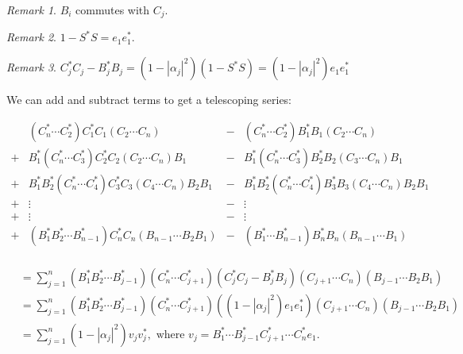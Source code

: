 \documentclass[twofold]{article}
\newcommand*\adj[1]{#1^*}
\newcommand*\abs[1]{\left \vert #1 \right\vert}
\theoremstyle{plain}
\theoremstyle{definition}
\theoremstyle{remark}
\newtheorem*{remark}{Remark}
\begin{document}
\begin{remark} \(B_i\) commutes with \(C_j\). \end{remark}
\begin{remark} \(1 - \adj{S} S = e_1 \adj{e_1}\). \end{remark}
\begin{remark}\(\adj{C_j} C_j - \adj{B_j} B_j  = (1 - \abs{\alpha_j}^2) (1 - \adj{S} S)  = (1 - \abs{\alpha_j}^2) e_1 \adj{e_1}\) \end{remark}

We can add and subtract terms to get a telescoping series:

\[\begin{array}{cccc}
  & (\adj{C_n} \cdots \adj{C_2}) \adj{C_1} C_1 ( C_2 \cdots C_n) & - & (\adj{C_n} \cdots \adj{C_2}) \adj{B_1} B_1 (C_2 \cdots C_n) \\
 + & \adj{B_1} (\adj{C_n} \cdots \adj{C_3}) \adj{C_2} C_2( C_2 \cdots C_n) B_1 & -& \adj{B_1}(\adj{C_n} \cdots \adj{C_3}) \adj{B_2} B_2(C_3 \cdots C_n) B_1 \\
    + & \adj{B_1} \adj{B_2} (\adj{C_n} \cdots \adj{C_4})\adj{C_3} C_3( C_4 \cdots C_n) B_2 B_1& -& \adj{B_1} \adj{B_2}(\adj{C_n} \cdots \adj{C_4})\adj{B_3} B_3 (C_4 \cdots C_n) B_2 B_1 \\
 + & \vdots & -& \vdots  \\
 + & \vdots & -& \vdots  \\
 + & (\adj{B_1} \adj{B_2} \cdots \adj{B_{n-1}}) \adj{C_n} C_n  (B_{n-1} \cdots  B_2 B_1) & -& (\adj{B_1} \cdots \adj{B_{n-1}})\adj{B_n} B_n (B_{n-1} \cdots B_1) \\
\end{array}\]

\begin{equation*} \begin{split}
& = \sum_{j = 1} ^n (\adj{B_1} \adj{B_2} \cdots \adj{B_{j-1}})(\adj{C_{n}} \cdots \adj{C_{j+1}}) (\adj{C_j} C_j - \adj{B_j} B_j) (C_{j+1} \cdots C_n) (B_{j-1} \cdots B_2 B_1) \\
& = \sum_{j = 1} ^n (\adj{B_1} \adj{B_2} \cdots \adj{B_{j-1}})(\adj{C_{n}} \cdots \adj{C_{j+1}}) ((1-\abs{\alpha_j}^2) e_1 \adj{e_1}) (C_{j+1} \cdots C_n) (B_{j-1} \cdots B_2 B_1) \\
& =  \sum_{j=1} ^n (1-\abs{\alpha_j}^2) v_j \adj{v_j}, \text{ where } v_j = \adj{B_1} \cdots \adj{B_{j-1}} \adj{C_{j+1}} \cdots \adj{C_n} e_1.
\end{split}\end{equation*}
\end{document}
